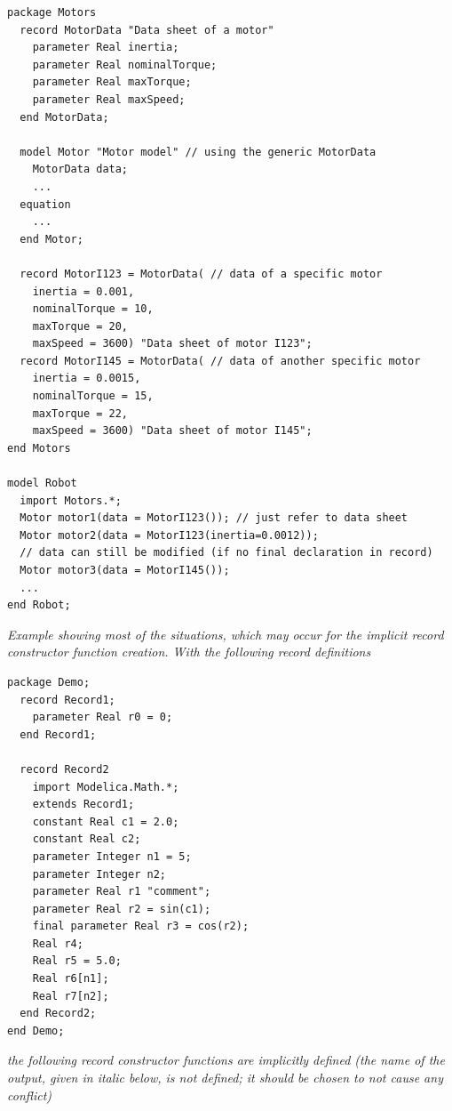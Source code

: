 \documentclass[10pt,a4paper]{report}
\begin{document}
\begin{lstlisting}[language=modelica]
package Motors
  record MotorData "Data sheet of a motor"
    parameter Real inertia;
    parameter Real nominalTorque;
    parameter Real maxTorque;
    parameter Real maxSpeed;
  end MotorData;

  model Motor "Motor model" // using the generic MotorData
    MotorData data;
    ...
  equation
    ...
  end Motor;
  
  record MotorI123 = MotorData( // data of a specific motor
    inertia = 0.001,
    nominalTorque = 10,
    maxTorque = 20,
    maxSpeed = 3600) "Data sheet of motor I123";
  record MotorI145 = MotorData( // data of another specific motor
    inertia = 0.0015,
    nominalTorque = 15,
    maxTorque = 22,
    maxSpeed = 3600) "Data sheet of motor I145";
end Motors

model Robot
  import Motors.*;
  Motor motor1(data = MotorI123()); // just refer to data sheet
  Motor motor2(data = MotorI123(inertia=0.0012));
  // data can still be modified (if no final declaration in record)
  Motor motor3(data = MotorI145());
  ...
end Robot;
\end{lstlisting}
\emph{Example showing most of the situations, which may occur for the
implicit record constructor function creation. With the following record
definitions}

\begin{lstlisting}[language=modelica]
package Demo;
  record Record1;
    parameter Real r0 = 0;
  end Record1;

  record Record2
    import Modelica.Math.*;
    extends Record1;
    constant Real c1 = 2.0;
    constant Real c2;
    parameter Integer n1 = 5;
    parameter Integer n2;
    parameter Real r1 "comment";
    parameter Real r2 = sin(c1);
    final parameter Real r3 = cos(r2);
    Real r4;
    Real r5 = 5.0;
    Real r6[n1];
    Real r7[n2];
  end Record2;
end Demo;
\end{lstlisting}
\emph{the following record constructor functions are implicitly defined
(the name of the output, given in italic below, is not defined; it
should be chosen to not cause any conflict)}
\end{document}
